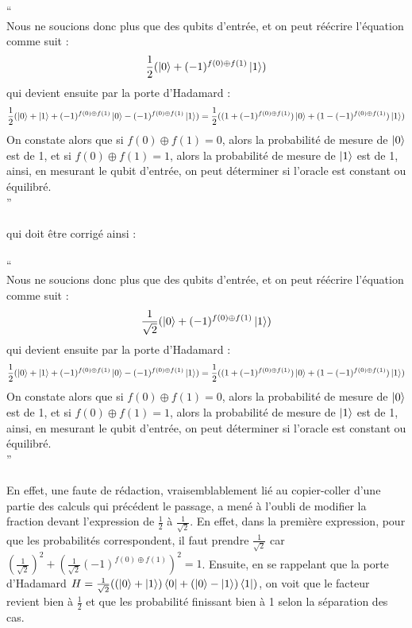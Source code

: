 \documentclass[11pt,a4paper]{article}
\begin{document}
``\\
Nous ne soucions donc plus que des qubits d'entrée, et on peut réécrire l'équation
comme suit :
\[
    \frac{1}{2} (\ket{0} + (-1)^{f(0) \oplus f(1)} \ket{1})
\]
qui devient ensuite par la porte d'Hadamard :
\[
    \frac{1}{2} (\ket{0} + \ket{1} + (-1)^{f(0) \oplus f(1)} \ket{0} - (-1)^{f(0) \oplus f(1)} \ket{1}) = \frac{1}{2} ((1 + (-1)^{f(0) \oplus f(1)}) \ket{0} + (1 - (-1)^{f(0) \oplus f(1)}) \ket{1})
\]
On constate alors que si $f(0) \oplus f(1) = 0$, alors la probabilité de mesure de
$\ket{0}$ est de 1, et si $f(0) \oplus f(1) = 1$, alors la probabilité de mesure de
$\ket{1}$ est de 1, ainsi, en mesurant le qubit d'entrée, on peut déterminer si
l'oracle est constant ou équilibré.\\
''\\ \\
qui doit être corrigé ainsi :\\ \\
``\\
Nous ne soucions donc plus que des qubits d'entrée, et on peut réécrire l'équation
comme suit :
\[
    \frac{1}{\sqrt{2}} (\ket{0} + (-1)^{f(0) \oplus f(1)} \ket{1})
\]
qui devient ensuite par la porte d'Hadamard :
\[
    \frac{1}{2} (\ket{0} + \ket{1} + (-1)^{f(0) \oplus f(1)} \ket{0} - (-1)^{f(0) \oplus f(1)} \ket{1}) = \frac{1}{2} ((1 + (-1)^{f(0) \oplus f(1)}) \ket{0} + (1 - (-1)^{f(0) \oplus f(1)}) \ket{1})
\]
On constate alors que si $f(0) \oplus f(1) = 0$, alors la probabilité de mesure de
$\ket{0}$ est de 1, et si $f(0) \oplus f(1) = 1$, alors la probabilité de mesure de
$\ket{1}$ est de 1, ainsi, en mesurant le qubit d'entrée, on peut déterminer si
l'oracle est constant ou équilibré.\\
''\\ \\
En effet, une faute de rédaction, vraisemblablement lié au copier-coller d'une partie des calculs qui précédent le passage, a mené à l'oubli de modifier la fraction devant l'expression de $\frac{1}{2}$ à $\frac{1}{\sqrt{2}}$. En effet, dans la première expression, pour que les probabilités correspondent, il faut prendre $\frac{1}{\sqrt{2}}$ car $(\frac{1}{\sqrt{2}})^2 + (\frac{1}{\sqrt{2}}(-1)^{f(0) \oplus f(1)})^2 = 1$. Ensuite, en se rappelant que la porte d'Hadamard $H = \frac{1}{\sqrt{2}} ((\ket{0}+\ket{1})\bra{0} + (\ket{0}-\ket{1})\bra{1})$, on voit que le facteur revient bien à $\frac{1}{2}$ et que les probabilité finissant bien à 1 selon la séparation des cas.
\end{document}
